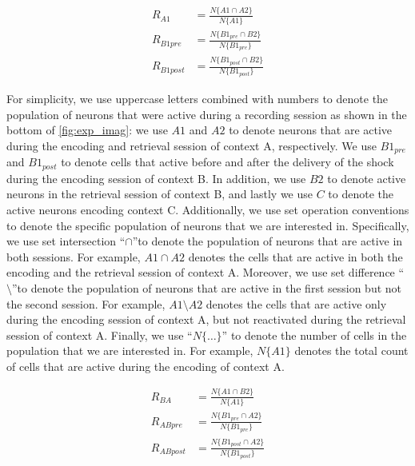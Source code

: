 \documentclass[master.tex]{subfiles}
\begin{document}
\begin{figure}
  \vspace{-15pt}
  \begin{align} \label{eq_react}
    R_{A1} & = \frac{N\{A1 \cap A2\}}{N\{A1\}} \nonumber \\
    R_{B1pre} & = \frac{N\{B1_{pre} \cap B2\}}{N\{B1_{pre}\}} \nonumber \\
    R_{B1post} & = \frac{N\{B1_{post} \cap B2\}}{N\{B1_{post}\}}
  \end{align}
  \vspace{-15pt}
\end{figure}

For simplicity, we use uppercase letters combined with numbers to denote the
population of neurons that were active during a recording session as shown in
the bottom of \autoref{fig:exp_imag}: we use $A1$ and $A2$ to denote neurons
that are active during the encoding and retrieval session of context A,
respectively. We use $B1_{pre}$ and $B1_{post}$ to denote cells that active
before and after the delivery of the shock during the encoding session of
context B. In addition, we use $B2$ to denote active neurons in the retrieval
session of context B, and lastly we use $C$ to denote the active neurons
encoding context C. Additionally, we use set operation conventions to denote the
specific population of neurons that we are interested in. Specifically, we use
set intersection ``$\cap$''to denote the population of neurons that are active
in both sessions. For example, $A1 \cap A2$ denotes the cells that are active in
both the encoding and the retrieval session of context A. Moreover, we use set
difference ``$\setminus$''to denote the population of neurons that are active in
the first session but not the second session. For example, $A1 \setminus A2$
denotes the cells that are active only during the encoding session of context A,
but not reactivated during the retrieval session of context A. Finally, we use
``$N\{\ldots\}$'' to denote the number of cells in the population that we are
interested in. For example, $N\{A1\}$ denotes the total count of cells that are
active during the encoding of context A.

\begin{figure}
  \vspace{-15pt}
  \begin{align} \label{eq_drift}
    R_{BA} & = \frac{N\{A1 \cap B2\}}{N\{A1\}} \nonumber \\
    R_{ABpre} & = \frac{N\{B1_{pre} \cap A2\}}{N\{B1_{pre}\}} \nonumber \\
    R_{ABpost} & = \frac{N\{B1_{post} \cap A2\}}{N\{B1_{post}\}}
  \end{align}
  \vspace{-15pt}
\end{figure}
\end{document}
